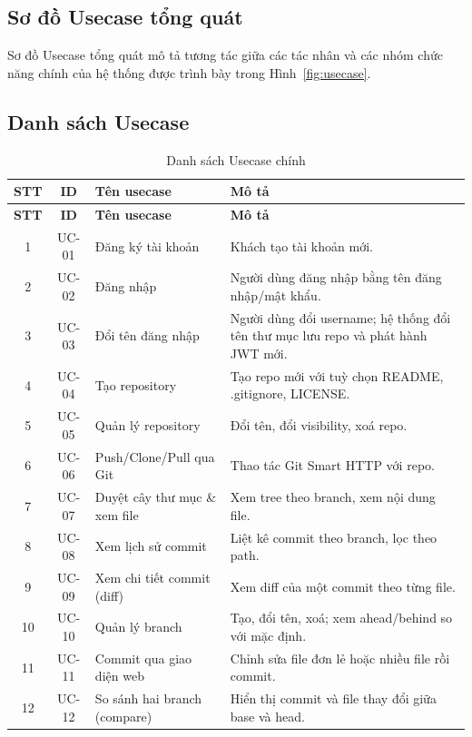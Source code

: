 \subsection{Sơ đồ Usecase tổng quát}
Sơ đồ Usecase tổng quát mô tả tương tác giữa các tác nhân và các nhóm chức năng chính của hệ thống được trình bày trong Hình~\ref{fig:usecase}.



\subsection{Danh sách Usecase}
\renewcommand{\arraystretch}{1.2}
\begin{longtable}{|c|c|p{5.2cm}|p{6.0cm}|}
\caption{Danh sách Usecase chính}\label{tab:uclist}\\
\hline\rowcolor{sgCream}\textbf{STT} & \textbf{ID} & \textbf{Tên usecase} & \textbf{Mô tả}\\\hline\endfirsthead
\hline\rowcolor{sgCream}\textbf{STT} & \textbf{ID} & \textbf{Tên usecase} & \textbf{Mô tả}\\\hline\endhead
1  & UC-01 & Đăng ký tài khoản & Khách tạo tài khoản mới.\\\hline
2  & UC-02 & Đăng nhập & Người dùng đăng nhập bằng tên đăng nhập/mật khẩu.\\\hline
3  & UC-03 & Đổi tên đăng nhập & Người dùng đổi username; hệ thống đổi tên thư mục lưu repo và phát hành JWT mới.\\\hline
4  & UC-04 & Tạo repository & Tạo repo mới với tuỳ chọn README, .gitignore, LICENSE.\\\hline
5  & UC-05 & Quản lý repository & Đổi tên, đổi visibility, xoá repo.\\\hline
6  & UC-06 & Push/Clone/Pull qua Git & Thao tác Git Smart HTTP với repo.\\\hline
7  & UC-07 & Duyệt cây thư mục \& xem file & Xem tree theo branch, xem nội dung file.\\\hline
8  & UC-08 & Xem lịch sử commit & Liệt kê commit theo branch, lọc theo path.\\\hline
9  & UC-09 & Xem chi tiết commit (diff) & Xem diff của một commit theo từng file.\\\hline
10 & UC-10 & Quản lý branch & Tạo, đổi tên, xoá; xem ahead/behind so với mặc định.\\\hline
11 & UC-11 & Commit qua giao diện web & Chỉnh sửa file đơn lẻ hoặc nhiều file rồi commit.\\\hline
12 & UC-12 & So sánh hai branch (compare) & Hiển thị commit và file thay đổi giữa base và head.\\\hline

\end{longtable}
